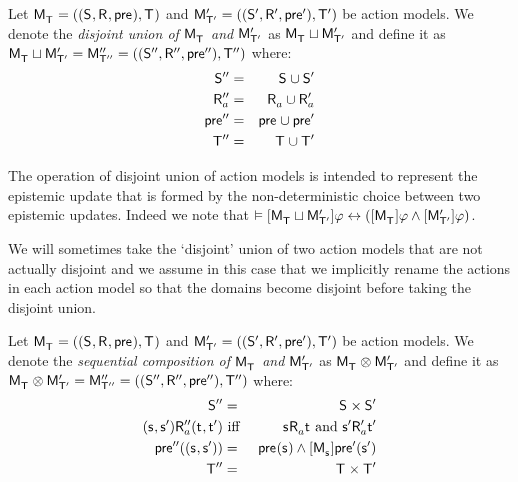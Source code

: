\begin{definition}
    Let $\aPModelAndTuple{\aStatesT}$ and $\aPModelAndTupleP{\aStatesTP}$ be action models.
    We denote the {\em disjoint union of $\aPModel{\aStatesT}$ and ${\mathsf{M}^{\prime}_{{\mathsf{{T}}^{\prime}}}}$} as $\aPModel{\aStatesT} \choice \aPModelP{\aStatesTP}$ and define it as $\aPModel{\aStatesT} \choice \aPModelP{\aStatesTP} = \aPModelAndTuplePP{\aStatesTPP}$ where:
    \begin{eqnarray*}
        \aStatesPP &=& \aStates \cup \aStatesP\\
        \aAccessibilityPPA &=& \aAccessibilityA \cup \aAccessibilityPA\\
        \aPreconditionPP &=& \aPrecondition \cup \aPreconditionP\\
        \aStatesTPP &=& \aStatesT \cup \aStatesTP
    \end{eqnarray*}
\end{definition}

The operation of disjoint union of action models is intended to represent the epistemic update that is formed by the non-deterministic choice between two epistemic updates.
Indeed we note that $\entails \actionA{\aPModel{\aStatesT} \choice \aPModelP{\aStatesTP}} \phi \iff (\actionA{\aPModel{\aStatesT}} \phi \land \actionA{\aPModelP{\aStatesTP}} \phi)$.

We will sometimes take the `disjoint' union of two action models that are not actually disjoint and we assume in this case that we implicitly rename the actions in each action model so that the domains become disjoint before taking the disjoint union.

\begin{definition}
    Let $\aPModelAndTuple{\aStatesT}$ and $\aPModelAndTupleP{\aStatesTP}$ be action models.
    We denote the {\em sequential composition of $\aPModel{\aStatesT}$ and ${\mathsf{M}^{\prime}_{{\mathsf{{T}}^{\prime}}}}$} as $\aPModel{\aStatesT} \compose \aPModelP{\aStatesTP}$ and define it as $\aPModel{\aStatesT} \compose \aPModelP{\aStatesTP} = \aPModelAndTuplePP{\aStatesTPP}$ where:
    \begin{eqnarray*}
        \aStatesPP &=& \aStates \times \aStatesP\\
        (\aStateS, \aStateSP) \aAccessibilityPPA (\aStateT, \aStateTP) &\text{ iff }& \aStateS \aAccessibilityA \aStateT \text{ and } \aStateSP \aAccessibilityPA \aStateTP\\
        \aPreconditionPP((\aStateS, \aStateSP)) &=& \aPrecondition(\aStateS) \land \actionA{\aPModel{\aStateS}} \aPreconditionP(\aStateSP)\\
        \aStatesTPP &=& \aStatesT \times \aStatesTP
    \end{eqnarray*}
\end{definition}

